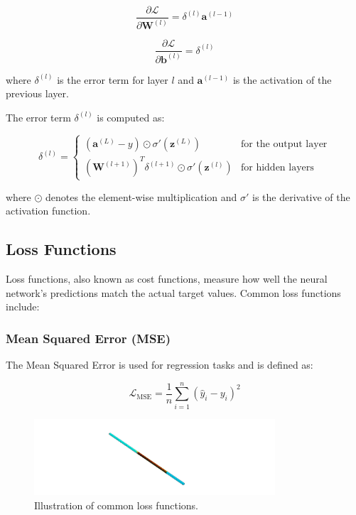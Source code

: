     \begin{equation}
    \frac{\partial \mathcal{L}}{\partial \mathbf{W}^{(l)}} = \delta^{(l)} \mathbf{a}^{(l-1)} 
    \end{equation}
    
    \begin{equation}
    \frac{\partial \mathcal{L}}{\partial \mathbf{b}^{(l)}} = \delta^{(l)}
    \end{equation}
    
    where \( \delta^{(l)} \) is the error term for layer \( l \) and \( \mathbf{a}^{(l-1)} \) is the activation of the previous layer.
    
    The error term \( \delta^{(l)} \) is computed as:
    
    \begin{equation}
    \delta^{(l)} = \begin{cases} 
    (\mathbf{a}^{(L)} - y) \odot \sigma'(\mathbf{z}^{(L)}) & \text{for the output layer} \\
    (\mathbf{W}^{(l+1)})^T \delta^{(l+1)} \odot \sigma'(\mathbf{z}^{(l)}) & \text{for hidden layers}
    \end{cases}
    \end{equation}
    
    where \( \odot \) denotes the element-wise multiplication and \( \sigma' \) is the derivative of the activation function.
    
    \subsection{Loss Functions}
    
        Loss functions, also known as cost functions, measure how well the neural network's predictions match the actual target values. Common loss functions include:
    
        \subsubsection{Mean Squared Error (MSE)}
    
            The Mean Squared Error is used for regression tasks and is defined as:
    
            \begin{equation}
            \mathcal{L}_{\text{MSE}} = \frac{1}{n} \sum_{i=1}^n (\hat{y}_i - y_i)^2
            \end{equation}
            
            \begin{figure}[h]
                \centering
                \includegraphics[width=0.8\textwidth]{00_Images/00_Velocity.png}
                \caption{Illustration of common loss functions.}
                \label{fig:loss_functions}
            \end{figure}
    

